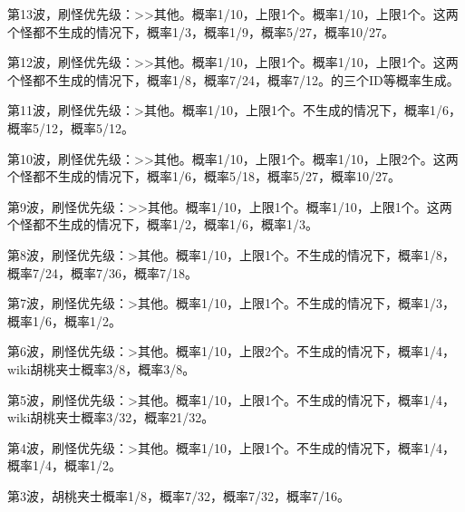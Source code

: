 第13波，刷怪优先级：>>其他。概率1/10，上限1个。概率1/10，上限1个。这两个怪都不生成的情况下，概率1/3，概率1/9，概率5/27，概率10/27。

第12波，刷怪优先级：>>其他。概率1/10，上限1个。概率1/10，上限1个。这两个怪都不生成的情况下，概率1/8，概率7/24，概率7/12。的三个ID等概率生成。

第11波，刷怪优先级：>其他。概率1/10，上限1个。不生成的情况下，概率1/6，概率5/12，概率5/12。

第10波，刷怪优先级：>>其他。概率1/10，上限1个。概率1/10，上限2个。这两个怪都不生成的情况下，概率1/6，概率5/18，概率5/27，概率10/27。

第9波，刷怪优先级：>>其他。概率1/10，上限1个。概率1/10，上限1个。这两个怪都不生成的情况下，概率1/2，概率1/6，概率1/3。

第8波，刷怪优先级：>其他。概率1/10，上限1个。不生成的情况下，概率1/8，概率7/24，概率7/36，概率7/18。

第7波，刷怪优先级：>其他。概率1/10，上限1个。不生成的情况下，概率1/3，概率1/6，概率1/2。

第6波，刷怪优先级：>其他。概率1/10，上限2个。不生成的情况下，概率1/4，wiki{胡桃夹士}概率3/8，概率3/8。

第5波，刷怪优先级：>其他。概率1/10，上限1个。不生成的情况下，概率1/4，wiki{胡桃夹士}概率3/32，概率21/32。

第4波，刷怪优先级：>其他。概率1/10，上限1个。不生成的情况下，概率1/4，概率1/4，概率1/2。

第3波，胡桃夹士概率1/8，概率7/32，概率7/32，概率7/16。

